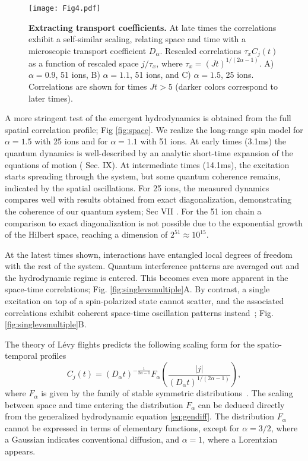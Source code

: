 \documentclass[aps,10pt,reprint,groupedaddress,superscriptaddress]{revtex4-2}
\begin{document}
\begin{figure*}
\centering
\texttt{[image: Fig4.pdf]}
\caption{\textbf{Extracting transport coefficients.} 
At late times the correlations exhibit a self-similar scaling, relating space and time with a microscopic transport coefficient $D_\alpha$. Rescaled correlations $\tau_x C_j(t)$ as a function of rescaled space $j/\tau_x$, where $\tau_x=(Jt)^{1/(2\alpha-1)}$. A) $\alpha = 0.9$, 51 ions, B) $\alpha = 1.1$, 51 ions, and C) $\alpha = 1.5$, 25 ions.  Correlations are shown for times $Jt>5$  (darker colors correspond to later times).}\label{fig:collapse}
\end{figure*}
  

A more stringent test of the emergent hydrodynamics is obtained from the full spatial correlation profile; Fig \ref{fig:space}. We realize the long-range spin model for $\alpha = 1.5$ with 25 ions and for $\alpha = 1.1$ with 51 ions. At early times (3.1ms) the quantum dynamics is well-described by an analytic short-time expansion of the equations of motion (\cite{SI} Sec. IX). At intermediate times (14.1ms), the excitation starts spreading through the system, but some quantum coherence remains, indicated by the spatial oscillations. For 25 ions, the measured dynamics compares well with results obtained from exact diagonalization, demonstrating the coherence of our quantum system; Sec VII \cite{SI}. For the 51 ion chain a comparison to exact diagonalization is not possible due to the exponential growth of the Hilbert space, reaching a dimension of $2^{51}\approx 10^{15}$. 


 
At the latest times shown, interactions have entangled local degrees of freedom with the rest of the system. Quantum interference patterns are averaged out and the hydrodynamic regime is entered. This becomes even more apparent in the space-time correlations; Fig. \ref{fig:singlevsmultiple}A. By contrast, a single excitation on top of a spin-polarized state cannot scatter, and the associated correlations exhibit coherent space-time oscillation patterns instead~\cite{jurcevic_quasiparticle_2014}; Fig. \ref{fig:singlevsmultiple}B.

The theory of L\'evy flights predicts the following scaling form for the spatio-temporal profiles 
\begin{equation}
    C_j(t) = (D_\alpha t)^{-\frac{1}{2\alpha -1}} F_\alpha\left(\frac{|j|}{(D_\alpha t)^{1/(2\alpha-1)}}\right),
\label{eq:scaling_form}
\end{equation}
where $F_\alpha$ is given by the family of stable symmetric distributions~\cite{RevModPhys.87.483}. The scaling between space and time entering the distribution $F_\alpha$ can be deduced directly from the generalized hydrodynamic equation \eqref{eq:gendiff}. The distribution $F_\alpha$ cannot be expressed in terms of elementary functions, except for $\alpha = 3/2$, where a Gaussian indicates conventional diffusion, and $\alpha = 1$, where a Lorentzian appears. 
\end{document}
